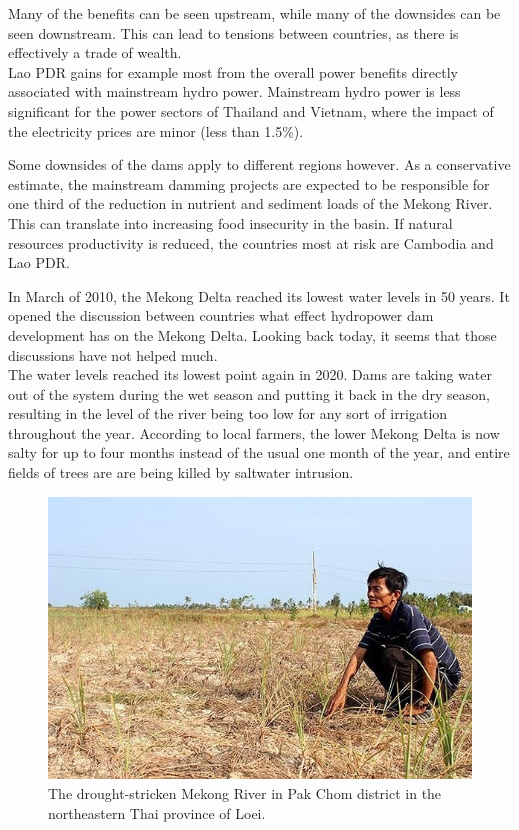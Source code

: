 Many of the benefits can be seen upstream, while many of the downsides can be seen downstream. This can lead to tensions between countries, as there is effectively a trade of wealth.\\

Lao PDR gains for example most from the overall power benefits directly associated with mainstream hydro power. Mainstream hydro power is less significant for the power sectors of Thailand and Vietnam, where the impact of the electricity prices are minor (less than 1.5\%).

Some downsides of the dams apply to different regions however. As a conservative estimate, the mainstream damming projects are expected to be responsible for one third of the reduction in nutrient and sediment loads of the Mekong River. This can translate into increasing food insecurity in the basin. If natural resources productivity is reduced, the countries most at risk are Cambodia and Lao PDR.

In March of 2010, the Mekong Delta reached its lowest water levels in 50 years. It opened the discussion between countries what effect hydropower dam development has on the Mekong Delta. \cite{globalissues} Looking back today, it seems that those discussions have not helped much. \\

The water levels reached its lowest point again in 2020. Dams are taking water out of the system during the wet season and putting it back in the dry season, resulting in the level of the river being too low for any sort of irrigation throughout the year. According to local farmers, the lower Mekong Delta is now salty for up to four months instead of the usual one month of the year, and entire fields of trees are are being killed by saltwater intrusion. \cite{voanews}



\begin{figure}[h]
\centering
\includegraphics[scale=0.55]{mekong/41_paddy.jpg}
\caption{The drought-stricken Mekong River in Pak Chom district in the northeastern Thai province of Loei. 
\cite{voanews}}
\end{figure}

